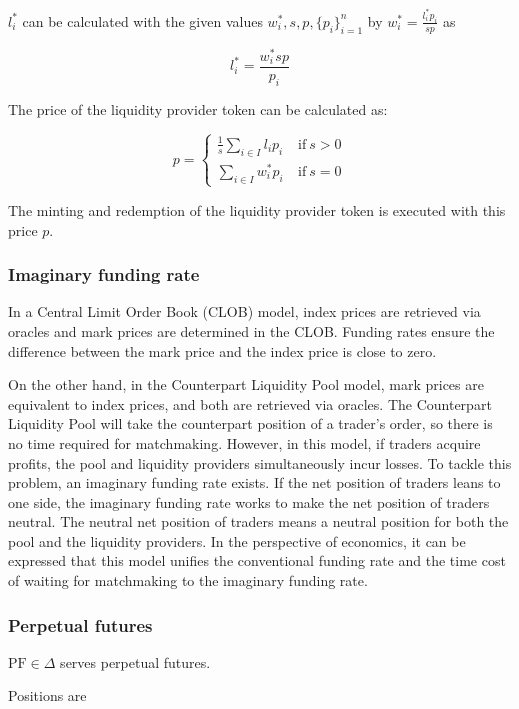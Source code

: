 \documentclass[dvipdfmx]{jsarticle}
\begin{document}
$l_i^*$ can be calculated with the given values $w_i^*, s, p, \{p_i\}_{i=1}^n$ by $w_i^* = \frac{l_i^* p_i}{s p}$ as

$$
  l_i^* = \frac{w_i^* s p}{p_i}
$$

The price of the liquidity provider token can be calculated as:

$$
  p = \left\{
    \begin{aligned}
      \frac{1}{s} \sum_{i \in I} l_i p_i & \ \text{if} \ s > 0 \\
      \sum_{i \in I} w_i^* p_i & \ \text{if} \ s = 0
    \end{aligned}
  \right.
$$

The minting and redemption of the liquidity provider token is executed with this price $p$.

\subsubsection{Imaginary funding rate}

In a Central Limit Order Book (CLOB) model, index prices are retrieved via oracles and mark prices are determined in the CLOB. 
Funding rates ensure the diﬀerence between the mark price and the index price is close to zero.

On the other hand, in the Counterpart Liquidity Pool model, mark prices are equivalent to index prices, and both are retrieved via oracles. 
The Counterpart Liquidity Pool will take the counterpart position of a trader’s order, so there is no time required for matchmaking. 
However, in this model, if traders acquire proﬁts, the pool and liquidity providers simultaneously incur losses. 
To tackle this problem, an imaginary funding rate exists. 
If the net position of traders leans to one side, the imaginary funding rate works to make the net position of traders neutral.  
The neutral net position of traders means a neutral position for both the pool and the liquidity providers. 
In the perspective of economics, it can be expressed that this model uniﬁes the conventional funding rate and the time cost of waiting for matchmaking to the imaginary funding rate.

\subsubsection{Perpetual futures}

$\text{PF} \in \Delta$ serves perpetual futures.

Positions are
\end{document}
